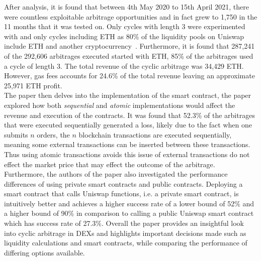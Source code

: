 After analysis, it is found that between 4th May 2020 to 15th April 2021, there were countless exploitable arbitrage opportunities and in fact grew to 1,750 in the 11 months that it was tested on. Only cycles with length 3 were experimented with and only cycles including ETH as 80\% of the liquidity pools on Uniswap include ETH and another cryptocurrency~\cite{heimbach2021behavior}. Furthermore, it is found that 287,241 of the 292,606 arbitrages executed started with ETH, 85\% of the arbitrages used a cycle of length 3. The total revenue of the cyclic arbitrage was 34,429 ETH. However, gas fees accounts for 24.6\% of the total revenue leaving an approximate 25,971 ETH profit.
\\[5mm]
The paper then delves into the implementation of the smart contract, the paper explored how both \textit{sequential} and \textit{atomic} implementations would affect the revenue and execution of the contracts. It was found that 52.3\% of the arbitrages that were executed sequentially generated a loss, likely due to the fact when one submits $n$ orders, the $n$ blockchain transactions are executed sequentially, meaning some external transactions can be inserted between these transactions. Thus using atomic transactions avoids this issue of external transactions do not effect the market price that may effect the outcome of the arbitrage.
\\[5mm]
Furthermore, the authors of the paper also investigated the performance differences of using private smart contracts and public contracts. Deploying a smart contract that calls Uniswap functions, i.e. a private smart contract, is intuitively better and achieves a higher success rate of a lower bound of 52\% and a higher bound of 90\% in comparison to calling a public Uniswap smart contract which has success rate of 27.3\%. Overall the paper provides an insightful look into cyclic arbitrage in DEXs and highlights important decisions made such as liquidity calculations and smart contracts, while comparing the performance of differing options available.

% 

